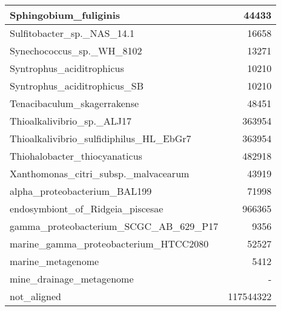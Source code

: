 \documentclass[12pt,a4paper]{article}
\begin{document}
\begin{table}[ht]
\begin{center}
\begin{tabular}{|l*{1}{|r}|}
Sphingobium\_fuliginis & 44433 \\ \hline
Sulfitobacter\_sp.\_NAS\_14.1 & 16658 \\ \hline
Synechococcus\_sp.\_WH\_8102 & 13271 \\ \hline
Syntrophus\_aciditrophicus & 10210 \\ \hline
Syntrophus\_aciditrophicus\_SB & 10210 \\ \hline
Tenacibaculum\_skagerrakense & 48451 \\ \hline
Thioalkalivibrio\_sp.\_ALJ17 & 363954 \\ \hline
Thioalkalivibrio\_sulfidiphilus\_HL\_EbGr7 & 363954 \\ \hline
Thiohalobacter\_thiocyanaticus & 482918 \\ \hline
Xanthomonas\_citri\_subsp.\_malvacearum & 43919 \\ \hline
alpha\_proteobacterium\_BAL199 & 71998 \\ \hline
endosymbiont\_of\_Ridgeia\_piscesae & 966365 \\ \hline
gamma\_proteobacterium\_SCGC\_AB\_629\_P17 & 9356 \\ \hline
marine\_gamma\_proteobacterium\_HTCC2080 & 52527 \\ \hline
marine\_metagenome & 5412 \\ \hline
mine\_drainage\_metagenome & - \\ \hline
not\_aligned & 117544322 \\ \hline
\end{tabular}
\end{center}
\end{table}
\end{document}
